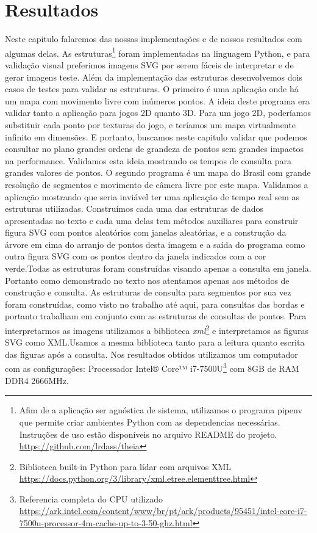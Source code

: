 \chapter{Resultados}
Neste capitulo falaremos das nossas implementações e de nossos resultados com algumas delas. As estruturas\footnote{Afim de a aplicação ser agnóstica de sistema, utilizamos o programa pipenv que permite criar ambientes Python com as dependencias necessárias. Instruções de uso estão disponíveis no arquivo README do projeto. \url{https://github.com/lrdass/theia}} foram implementadas na linguagem Python, e para validação visual preferimos imagens SVG por serem fáceis de interpretar e de gerar imagens teste. Além da implementação das estruturas desenvolvemos dois casos de testes para validar as estruturas. O primeiro é uma aplicação onde há um mapa com movimento livre com inúmeros pontos. A ideia deste programa era validar tanto a aplicação para jogos 2D quanto 3D. Para um jogo 2D, poderíamos substituir cada ponto por texturas do jogo, e teríamos um mapa virtualmente infinito em dimensões. E portanto, buscamos neste capitulo validar que podemos consultar no plano grandes ordens de grandeza de pontos sem grandes impactos na performance. Validamos esta ideia mostrando os tempos de consulta para grandes valores de pontos. O segundo programa é um mapa do Brasil com grande resolução de segmentos e movimento de câmera livre por este mapa. Validamos a aplicação mostrando que seria inviável ter uma aplicação de tempo real sem as estruturas utilizadas. Construímos cada uma das estruturas de dados apresentadas no texto e cada uma delas tem métodos auxiliares para construir figura SVG com pontos aleatórios com janelas aleatórias, e a construção da árvore em cima do arranjo de pontos desta imagem e a saída do programa como outra figura SVG com os pontos dentro da janela indicados com a cor verde.Todas as estruturas foram construídas visando apenas a consulta em janela. Portanto como demonstrado no texto nos atentamos apenas aos métodos de construção e consulta. As estruturas de consulta para segmentos por sua vez foram construídas, como visto no trabalho até aqui, para consultas das bordas e portanto trabalham em conjunto com as estruturas de consultas de pontos. Para interpretarmos as imagens utilizamos a biblioteca \textit{xml}\footnote{Biblioteca built-in Python para lídar com arquivos XML \url{https://docs.python.org/3/library/xml.etree.elementtree.html}} e interpretamos as figuras SVG como XML.Usamos a mesma biblioteca tanto para a leitura quanto escrita das figuras após a consulta. Nos resultados obtidos utilizamos um computador com as configurações: Processador Intel® Core™ i7-7500U\footnote{Referencia completa do CPU utilizado \url{https://ark.intel.com/content/www/br/pt/ark/products/95451/intel-core-i7-7500u-processor-4m-cache-up-to-3-50-ghz.html}} com 8GB de RAM DDR4 2666MHz.

